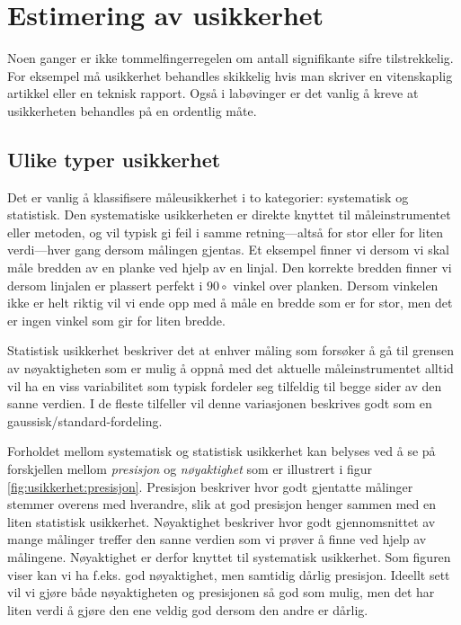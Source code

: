 \section{Estimering av usikkerhet}
Noen ganger er ikke tommelfingerregelen om antall signifikante sifre tilstrekkelig. For eksempel må usikkerhet behandles skikkelig hvis man skriver en vitenskaplig artikkel eller en teknisk rapport. Også i labøvinger er det vanlig å kreve at usikkerheten behandles på en ordentlig måte. 

\subsection{Ulike typer usikkerhet}
Det er vanlig å klassifisere måleusikkerhet i to kategorier: systematisk og statistisk. Den systematiske usikkerheten er direkte knyttet til måleinstrumentet eller metoden, og vil typisk gi feil i samme retning---altså for stor eller for liten verdi---hver gang dersom målingen gjentas. Et eksempel finner vi dersom vi skal måle bredden av en planke ved hjelp av en linjal. Den korrekte bredden finner vi dersom linjalen er plassert perfekt i $90\circ$ vinkel over planken. Dersom vinkelen ikke er helt riktig vil vi ende opp med å måle en bredde som er for stor, men det er ingen vinkel som gir for liten bredde. 

Statistisk usikkerhet beskriver det at enhver måling som forsøker å gå til grensen av nøyaktigheten som er mulig å oppnå med det aktuelle måle\-instrumentet alltid vil ha en viss variabilitet som typisk fordeler seg tilfeldig til begge sider av den sanne verdien. I de fleste tilfeller vil denne variasjonen beskrives godt som en gaussisk/standard-fordeling. 

Forholdet mellom systematisk og statistisk usikkerhet kan belyses ved å se på forskjellen mellom \emph{presisjon} og \emph{nøyaktighet} som er illustrert i figur \ref{fig:usikkerhet:presisjon}. Presisjon beskriver hvor godt gjentatte målinger stemmer overens med hverandre, slik at god presisjon henger sammen med en liten statistisk usikkerhet. Nøyaktighet beskriver hvor godt gjennomsnittet av mange målinger treffer den sanne verdien som vi prøver å finne ved hjelp av målingene. Nøyaktighet er derfor knyttet til systematisk usikkerhet. Som figuren viser kan vi ha f.eks. god nøyaktighet, men samtidig dårlig presisjon. Ideellt sett vil vi gjøre både nøyaktigheten og presisjonen så god som mulig, men det har liten verdi å gjøre den ene veldig god dersom den andre er dårlig.

